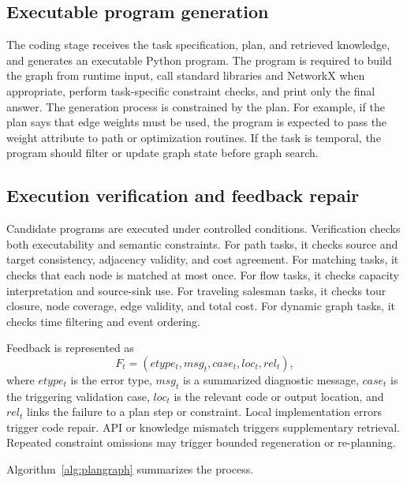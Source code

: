 \documentclass[pdflatex,iicol,sn-mathphys-num]{sn-jnl}
\theoremstyle{thmstyleone}
\theoremstyle{thmstyletwo}
\theoremstyle{thmstylethree}
\begin{document}
\subsection{Executable program generation}

The coding stage receives the task specification, plan, and retrieved knowledge, and generates an executable Python program. The program is required to build the graph from runtime input, call standard libraries and NetworkX when appropriate, perform task-specific constraint checks, and print only the final answer. The generation process is constrained by the plan. For example, if the plan says that edge weights must be used, the program is expected to pass the weight attribute to path or optimization routines. If the task is temporal, the program should filter or update graph state before graph search.

\subsection{Execution verification and feedback repair}

Candidate programs are executed under controlled conditions. Verification checks both executability and semantic constraints. For path tasks, it checks source and target consistency, adjacency validity, and cost agreement. For matching tasks, it checks that each node is matched at most once. For flow tasks, it checks capacity interpretation and source-sink use. For traveling salesman tasks, it checks tour closure, node coverage, edge validity, and total cost. For dynamic graph tasks, it checks time filtering and event ordering.

Feedback is represented as
\begin{equation}
F_t=(etype_t,msg_t,case_t,loc_t,rel_t),
\end{equation}
where $etype_t$ is the error type, $msg_t$ is a summarized diagnostic message, $case_t$ is the triggering validation case, $loc_t$ is the relevant code or output location, and $rel_t$ links the failure to a plan step or constraint. Local implementation errors trigger code repair. API or knowledge mismatch triggers supplementary retrieval. Repeated constraint omissions may trigger bounded regeneration or re-planning.

Algorithm~\ref{alg:plangraph} summarizes the process.
\end{document}
